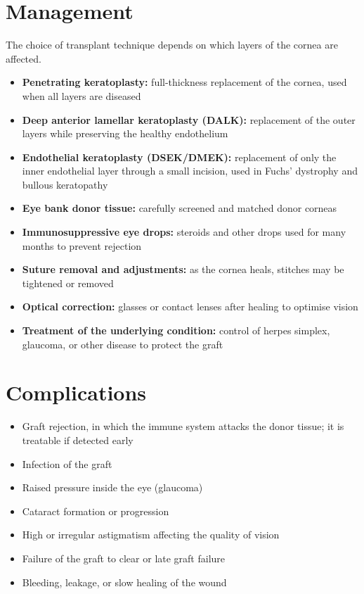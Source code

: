 \section*{Management}
The choice of transplant technique depends on which layers of the cornea are affected.

\begin{itemize}
    \item \textbf{Penetrating keratoplasty:} full-thickness replacement of the cornea, used when all layers are diseased
    \item \textbf{Deep anterior lamellar keratoplasty (DALK):} replacement of the outer layers while preserving the healthy endothelium
    \item \textbf{Endothelial keratoplasty (DSEK/DMEK):} replacement of only the inner endothelial layer through a small incision, used in Fuchs' dystrophy and bullous keratopathy
    \item \textbf{Eye bank donor tissue:} carefully screened and matched donor corneas
    \item \textbf{Immunosuppressive eye drops:} steroids and other drops used for many months to prevent rejection
    \item \textbf{Suture removal and adjustments:} as the cornea heals, stitches may be tightened or removed
    \item \textbf{Optical correction:} glasses or contact lenses after healing to optimise vision
    \item \textbf{Treatment of the underlying condition:} control of herpes simplex, glaucoma, or other disease to protect the graft
\end{itemize}

\section*{Complications}
\begin{itemize}
    \item Graft rejection, in which the immune system attacks the donor tissue; it is treatable if detected early
    \item Infection of the graft
    \item Raised pressure inside the eye (glaucoma)
    \item Cataract formation or progression
    \item High or irregular astigmatism affecting the quality of vision
    \item Failure of the graft to clear or late graft failure
    \item Bleeding, leakage, or slow healing of the wound
\end{itemize}


